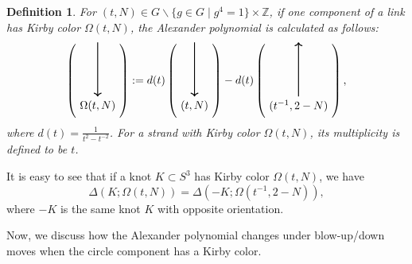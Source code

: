 \documentclass[12pt]{amsart}
\newtheorem{defn}[theo]{Definition}
\begin{document}
\begin{defn}
\rm
For $(t, N)\in G\backslash \{g\in G \mid g^4=1\}\times \mathbb{Z}$, if one component of a link has {\it Kirby color} $\Omega (t, N)$, the Alexander polynomial is calculated as follows:
\begin{align*}
\left(\begin{tikzpicture}[baseline=-0.65ex, thick, scale=1]
\draw (0.5,-0.5) [<-]  to (0.5,1.2);
\draw (0.5,-0.8) node {$\Omega(t, N)$};
\end{tikzpicture}\right):=d(t)\left(\begin{tikzpicture}[baseline=-0.65ex, thick, scale=1]
\draw (0.5,-0.5) [<-]  to (0.5,1.2);
\draw (0.5,-0.8) node {$(t, N)$};
\end{tikzpicture}\right)-d(t)\left(\begin{tikzpicture}[baseline=-0.65ex, thick, scale=1]
\draw (0.5,-0.5) [->]  to (0.5,1.2);
\draw (0.5,-0.8) node {$(t^{-1}, 2-N)$};
\end{tikzpicture}\right),
\end{align*}
where $d(t)=\frac{1}{t^2-t^{-2}}$.
For a strand with Kirby color $\Omega (t, N)$, its {\it multiplicity} is defined to be $t$.
\end{defn}

It is easy to see that if a knot $K\subset S^3$ has Kirby color $\Omega (t, N)$, we have
$$\Delta (K; \Omega (t, N))=\Delta (-K; \Omega (t^{-1}, 2-N)),$$
where $-K$ is the same knot $K$ with opposite orientation.

Now, we discuss how the Alexander polynomial changes under blow-up/down moves when the circle component has a Kirby color.
\end{document}
